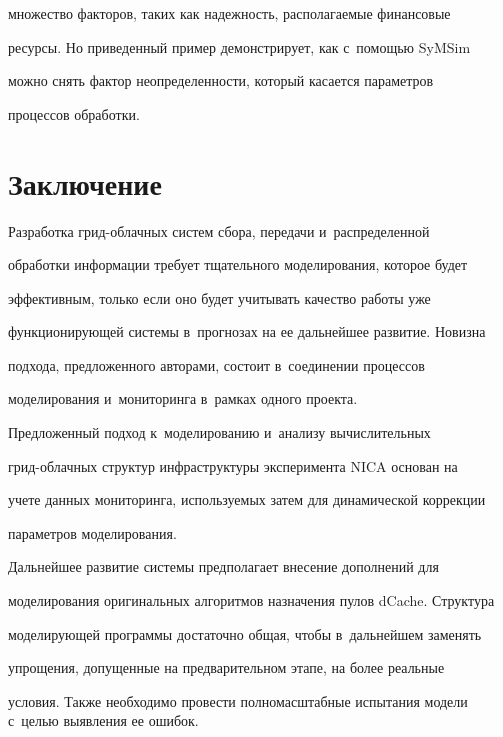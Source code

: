множество факторов, таких как надежность, располагаемые финансовые


ресурсы. Но приведенный пример демонстрирует, как с~помощью SyMSim


можно снять фактор неопределенности, который касается параметров


процессов обработки.





\section{Заключение}





  Разработка грид-облачных систем сбора, передачи и~распределенной


обработки информации требует тщательного моделирования, которое будет


эффективным, только если оно будет учитывать качество работы уже


функционирующей системы в~прогнозах на ее дальнейшее развитие. Новизна


подхода, предложенного авторами, состоит в~соединении процессов


моделирования и~мониторинга в~рамках одного проекта.





  Предложенный подход к~моделированию и~анализу вычислительных


  грид-об\-лач\-ных структур инфраструктуры эксперимента NICA основан на


учете данных мониторинга, используемых затем для динамической коррекции


параметров моделирования.





  Дальнейшее развитие системы предполагает внесение дополнений для


моделирования оригинальных алгоритмов назначения пулов dCache. Структура


моделирующей программы достаточно общая, чтобы в~дальнейшем заменять


упрощения, допущенные на предварительном этапе, на более реальные


условия. Также необходимо провести полномасштабные испытания модели с~целью выявления ее ошибок.





